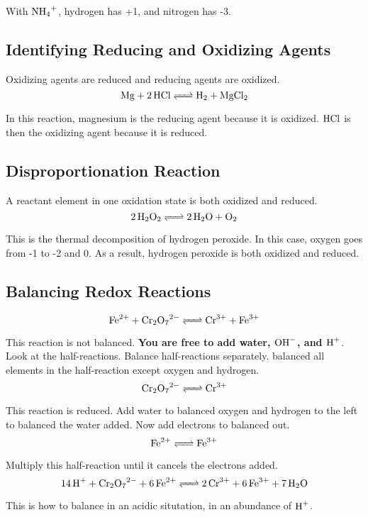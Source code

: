 \documentclass{article}
\begin{document}
With $\ce{NH_4+}$, hydrogen has +1, and nitrogen has -3.

\subsection{Identifying Reducing and Oxidizing Agents}

Oxidizing agents are reduced and reducing agents are oxidized.
$$\ce{Mg + 2HCl <=> H_2 + MgCl_2}$$

In this reaction, magnesium is the reducing agent because it is oxidized.
$\ce{HCl}$ is then the oxidizing agent because it is reduced.

\subsection{Disproportionation Reaction}

A reactant element in one oxidation state is both oxidized and reduced.
$$\ce{2H_2O_2 <=> 2H_2O + O_2}$$

This is the thermal decomposition of hydrogen peroxide. In this case, oxygen
goes from -1 to -2 and 0. As a result, hydrogen peroxide is both oxidized and
reduced.

\subsection{Balancing Redox Reactions}
$$\ce{Fe^{2+} + Cr_2O_7^{2-} <=> Cr^{3+} + Fe^{3+}}$$

This reaction is not balanced. \textbf{You are free to add water, $\ce{OH-}$,
and $\ce{H+}$}. Look at the half-reactions. Balance half-reactions separately.
balanced all elements in the half-reaction except oxygen and hydrogen. 
$$\ce{Cr_2O_7^{2-} <=> Cr^{3+}}$$

This reaction is reduced. Add water to balanced oxygen and hydrogen to the left
to balanced the water added. Now add electrons to balanced out.
$$\ce{Fe^{2+} <=> Fe^{3+}}$$

Multiply this half-reaction until it cancels the electrons added.
$$\ce{14H+ + Cr_2O_7^{2-} + 6Fe^{2+} <=> 2Cr^{3+} + 6Fe^{3+} + 7H_2O}$$

This is how to balance in an acidic situtation, in an abundance of $\ce{H+}$.
\end{document}
